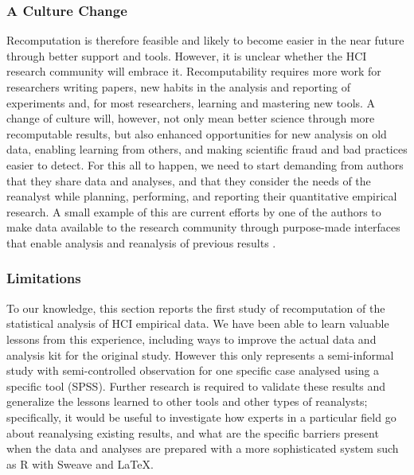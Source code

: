 \subsubsection{A Culture Change}
Recomputation is therefore feasible and likely to become easier in the near future through better support and tools. However, it is unclear whether the HCI research community will embrace it. Recomputability requires more work for researchers writing papers, new habits in the analysis and reporting of experiments and, for most researchers, learning and mastering new tools. A change of culture will, however, not only mean better science through more recomputable results, but also enhanced opportunities for new analysis on old data, enabling learning from others, and making scientific fraud and bad practices easier to detect. For this all to happen, we need to start demanding from authors that they share data and analyses, and that they consider the needs of the reanalyst while planning, performing, and reporting their quantitative empirical research. A small example of this are current efforts by one of the authors to make data available to the research community through purpose-made interfaces that enable analysis and reanalysis of previous results \cite{Grijincu:2014}. 

\subsubsection{Limitations}
To our knowledge, this section reports the first study of recomputation of the statistical analysis of HCI empirical data. We have been able to learn valuable lessons from this experience, including ways to improve the actual data and analysis kit for the original study. However this only represents a semi-informal study with semi-controlled observation for one specific case analysed using a specific tool (SPSS). Further research is required to validate these results and generalize the lessons learned to other tools and other types of reanalysts; specifically, it would be useful to investigate how experts in a particular field go about reanalysing existing results, and what are the specific barriers present when the data and analyses are prepared with a more sophisticated system such as R with Sweave and \LaTeX.


